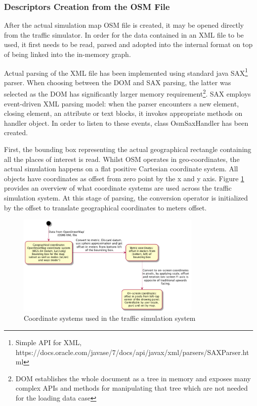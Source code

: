 \subsubsection{Descriptors Creation from the OSM File}
After the actual simulation map OSM file is created, it may be opened directly from the traffic simulator. In order for the data contained in an XML file to be used, it first needs to be read, parsed and adopted into the internal format on top of being linked into the in-memory graph.

Actual parsing of the XML file has been implemented using standard java SAX\footnote{Simple API for XML, https://docs.oracle.com/javase/7/docs/api/javax/xml/parsers/SAXParser.html} parser. When choosing between the DOM and SAX parsing, the latter was selected as the DOM has significantly larger memory requirement\footnote{DOM establishes the whole document as a tree in memory and exposes many complex APIs and methods for manipulating that tree which are not needed for the loading data case}. SAX employs event-driven XML parsing model: when the parser encounters a new element, closing element, an attribute or text blocks, it invokes appropriate methods on handler object. In order to listen to these events, class OsmSaxHandler has been created.

First, the bounding box representing the actual geographical rectangle containing all the places of interest is read. Whilst OSM operates in geo-coordinates, the actual simulation happens on a flat positive Cartesian coordinate system. All objects have coordinates as offset from zero point by the x and y axis. Figure \ref{fig:coordinateConversions} provides an overview of what coordinate systems are used across the traffic simulation system. At this stage of parsing, the conversion operator is initialized by the offset to translate geographical coordinates to meters offset.

\begin{figure}[h]
    \vspace{1.5em}
    \caption{Coordinate systems used in the traffic simulation system}
    \label{fig:coordinateConversions}
    \centering
    \includegraphics[width=0.8\textwidth]{../../uml_diagrams/coordinateSystems.png}
    \vspace{1.5em}
\end{figure}

